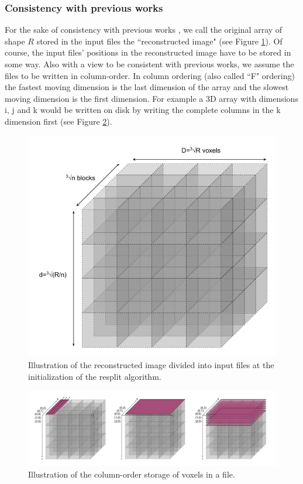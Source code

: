 \documentclass[conference]{IEEEtran}
\begin{document}
\subsubsection{Consistency with previous works}
For the sake of consistency with previous works \cite{seqalgorithms}, we call the original array of shape $R$ stored in the input files the ``reconstructed image" (see Figure \ref{fig:reconstructed_img_divided}).
Of course, the input files' positions in the reconstructed image have to be stored in some way.
Also with a view to be consistent with previous works, we assume the files to be written in column-order.
In column ordering (also called ``F" ordering) the fastest moving dimension is the last dimension of the array and the slowest moving dimension is the first dimension.
For example a 3D array with dimensions i, j and k would be written on disk by writing the complete columns in the k dimension first (see Figure \ref{fig:column_order}).

\begin{figure}[h!]
\centering
\includegraphics[scale=0.3]{./figures/reconstructed_img_divided.png}
\caption{Illustration of the reconstructed image divided into input files at the initialization of the resplit algorithm.
}
\label{fig:reconstructed_img_divided}
\end{figure}

\begin{figure}[h!]
\centering
\includegraphics[scale=0.25]{./figures/column_order.png}
\caption{Illustration of the column-order storage of voxels in a file.
}
\label{fig:column_order}
\end{figure}
\end{document}
